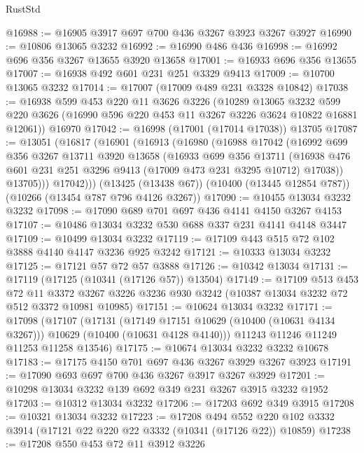\begin{lexlean}{RustStd}
\begin{coremodule}
{\begin{coremodule}
{{{{{{{{{{{{{{{{{{{{{{{{{@16988 := @16905 @3917 @697 @700 @436 @3267 @3923 @3267 @3927
@16990 := @10806 @13065 @3232
@16992 := @16990 @486 @436
@16998 := @16992 @696 @356 @3267 @13655 @3920 @13658
@17001 := @16933 @696 @356 @13655
@17007 := @16938 @492 @601 @231 @251 @3329 @9413
@17009 := @10700 @13065 @3232
@17014 := @17007 (@17009 @489 @231 @3328 @10842)
@17038 := @16938
    @599
    @453
    @220
    @11
    @3626
    @3226
    (@10289
      @13065
      @3232
      @599
      @220
      @3626
      (@16990 @596 @220 @453 @11 @3267 @3226 @3624 @10822 @16881 @12061))
    @16970
@17042 := @16998 (@17001 (@17014 @17038)) @13705
@17087 := @13051
    (@16817
      (@16901
        (@16913
          (@16980
            (@16988
              @17042
              (@16992
                @699
                @356
                @3267
                @13711
                @3920
                @13658
                (@16933
                  @699
                  @356
                  @13711
                  (@16938 @476 @601 @231 @251 @3296 @9413 (@17009 @473 @231 @3295 @10712) @17038))
                @13705)))
          @17042)))
    (@13425 (@13438 @67))
    (@10400 (@13445 @12854 @787))
    (@10266 (@13454 @787 @796 @4126 @3267))
@17090 := @10455 @13034 @3232 @3232
@17098 := @17090 @689 @701 @697 @436 @4141 @4150 @3267 @4153
@17107 := @10486 @13034 @3232 @530 @688 @337 @231 @4141 @4148 @3447
@17109 := @10499 @13034 @3232
@17119 := @17109 @443 @515 @72 @102 @3888 @4140 @4147 @3236 @925 @3242
@17121 := @10333 @13034 @3232
@17125 := @17121 @57 @72 @57 @3888
@17126 := @10342 @13034
@17131 := @17119 (@17125 (@10341 (@17126 @57)) @13504)
@17149 := @17109
    @513
    @453
    @72
    @11
    @3372
    @3267
    @3226
    @3236
    @930
    @3242
    (@10387 @13034 @3232 @72 @512 @3372 @10981 @10985)
@17151 := @10624 @13034 @3232
@17171 := @17098
    (@17107
      (@17131
        (@17149 @17151 @10629 (@10400 (@10631 @4134 @3267)))
        @10629
        (@10400 (@10631 @4128 @4140)))
      @11243
      @11246
      @11249
      @11253
      @11258
      @13546)
@17175 := @10674 @13034 @3232 @3232 @10678
@17183 := @17175 @4150 @701 @697 @436 @3267 @3929 @3267 @3923
@17191 := @17090 @693 @697 @700 @436 @3267 @3917 @3267 @3929
@17201 := @10298 @13034 @3232 @139 @692 @349 @231 @3267 @3915 @3232 @1952
@17203 := @10312 @13034 @3232
@17206 := @17203 @692 @349 @3915
@17208 := @10321 @13034 @3232
@17223 := @17208
    @494
    @552
    @220
    @102
    @3332
    @3914
    (@17121 @22 @220 @22 @3332 (@10341 (@17126 @22)) @10859)
@17238 := @17208
    @550
    @453
    @72
    @11
    @3912
    @3226
}}}}}}}}}}}}}}}}}}}}}}}}}
\end{coremodule}}
\end{coremodule}
\end{lexlean}
